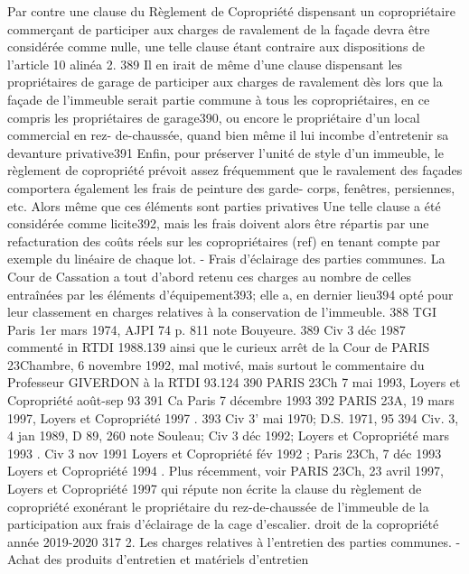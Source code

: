 		Par contre une clause du Règlement de Copropriété dispensant un copropriétaire commerçant de participer aux charges de ravalement de la façade devra être considérée comme nulle, une telle clause étant contraire aux dispositions de l'article 10 alinéa 2. 389
		Il en irait de même d'une clause dispensant les propriétaires de garage de participer aux charges de ravalement dès lors que la façade de l'immeuble serait partie commune à tous les copropriétaires, en ce compris les propriétaires de garage390, ou encore le propriétaire d’un local commercial en rez- de-chaussée, quand bien même il lui incombe d’entretenir sa devanture privative391
		Enfin, pour préserver l’unité de style d’un immeuble, le règlement de copropriété prévoit assez fréquemment que le ravalement des façades comportera également les frais de peinture des garde- corps, fenêtres, persiennes, etc. Alors même que ces éléments sont parties privatives Une telle clause a été considérée comme licite392, mais les frais doivent alors être répartis par une refacturation des coûts réels sur les copropriétaires (ref) en tenant compte par exemple du linéaire de chaque lot.
		- Frais d'éclairage des parties communes.
		La Cour de Cassation a tout d'abord retenu ces charges au nombre de celles entraînées par les éléments d'équipement393; elle a, en dernier lieu394 opté pour leur classement en charges relatives à la conservation de l'immeuble.
		388 TGI Paris 1er mars 1974, AJPI 74 p. 811 note Bouyeure.
		389 Civ 3 déc 1987 commenté in RTDI 1988.139 ainsi que le curieux arrêt de la Cour de PARIS 23\degres Chambre, 6 novembre 1992, mal motivé, mais surtout le commentaire du Professeur GIVERDON à la RTDI 93.124
		390 PARIS 23\degres Ch 7 mai 1993, Loyers et Copropriété août-sep 93 
		391 Ca Paris 7 décembre 1993
		392 PARIS 23\degres A, 19 mars 1997, Loyers et Copropriété 1997 .
		393 Civ 3' mai 1970; D.S. 1971, 95
		394 Civ. 3\degres, 4 jan 1989, D 89, 260 note Souleau; Civ 3 déc 1992; Loyers et Copropriété mars 1993 . Civ 3 nov 1991 Loyers et Copropriété fév 1992 ; Paris 23\degres Ch, 7 déc 1993 Loyers et Copropriété 1994 . Plus récemment, voir PARIS 23\degres Ch, 23 avril 1997, Loyers et Copropriété 1997  qui répute non écrite la clause du règlement de copropriété exonérant le propriétaire du rez-de-chaussée de l’immeuble de la participation aux frais d’éclairage de la cage d’escalier.
		droit de la copropriété année 2019-2020
		317
		2. Les charges relatives à l'entretien des parties communes.
		- Achat des produits d'entretien et matériels d'entretien
